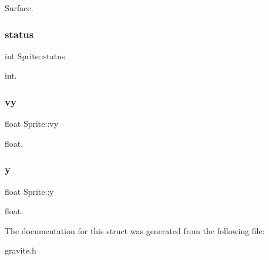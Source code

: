 Surface. \mbox{\label{structSprite_a2500f95508a713c1ce20b2f09ec652da}} 
\subsubsection{\texorpdfstring{status}{status}}
{\footnotesize\ttfamily int Sprite\+::status}

int. \mbox{\label{structSprite_a37bb959256da6b84fed64a3787fc9840}} 
\subsubsection{\texorpdfstring{vy}{vy}}
{\footnotesize\ttfamily float Sprite\+::vy}

float. \mbox{\label{structSprite_ad09503279ec7c1b96bf67566a917e183}} 
\subsubsection{\texorpdfstring{y}{y}}
{\footnotesize\ttfamily float Sprite\+::y}

float. 

The documentation for this struct was generated from the following file\+:\begin{DoxyCompactItemize}
\item 
gravite.\+h\end{DoxyCompactItemize}
